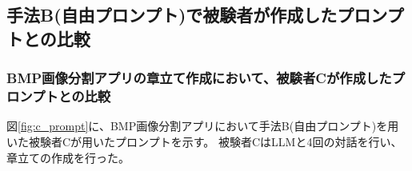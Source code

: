 \subsection{手法B(自由プロンプト)で被験者が作成したプロンプトとの比較}
\subsubsection{BMP画像分割アプリの章立て作成において、被験者Cが作成したプロンプトとの比較}
図\ref{fig:c_prompt}に、BMP画像分割アプリにおいて手法B(自由プロンプト)を用いた被験者Cが用いたプロンプトを示す。
被験者CはLLMと4回の対話を行い、章立ての作成を行った。

